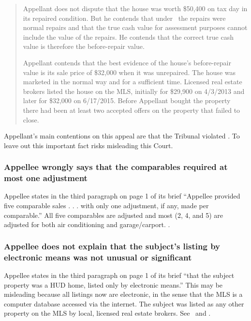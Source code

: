 \documentclass[12pt,\documentclassflag]{michiganCourtOfAppealsBrief}
\begin{document}
\begin{quotation}
  Appellant does not dispute that the house was worth \$50,400 on tax day in its repaired condition. But he contends that under \mathieuGast\ the repairs were normal repairs and that the true cash value for assessment purposes cannot include the value of the repairs. He contends that the correct true cash value is therefore the before-repair value. 

Appellant contends that the best evidence of the house's before-repair value is its sale price of \$32,000 when it was unrepaired. The house was marketed in the normal way and for a sufficient time. Licensed real estate brokers listed the house on the MLS, initially for \$29,900 on 4/3/2013 and later for \$32,000 on 6/17/2015. Before Appellant bought the property there had been at least two accepted offers on the property that failed to close.
\end{quotation}

Appellant's main contentions on this appeal are that the Tribunal violated \mathieuGast. To leave out this important fact risks misleading this Court.

\subsubsection{Appellee wrongly says that the comparables required at most one adjustment}

Appellee states in the third paragraph on page 1 of its brief ``Appellee provided five comparable sales . . . with only one adjustment, if any, made per comparable.'' All five comparables are adjusted and most (2, 4, and 5) are adjusted for both air conditioning and garage/carport. \cityEvidence[2].

\subsubsection{Appellee does not explain that the subject's listing by electronic means was not unusual or significant}


Appellee states in the third paragraph on page 1 of its brief ``that the subject property was a HUD home, listed only by electronic means.'' This may be misleading because all listings now are electronic, in the sense that the MLS is a computer database accessed via the internet. The subject was listed as any other property on the MLS by local, licensed real estate brokers. See \mlsListing\ and \mlsHistory.
\end{document}
